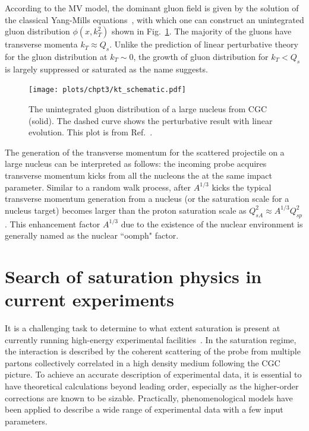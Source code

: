 According to the MV model, the dominant gluon field is given by the solution of
the classical Yang-Mills equations~\cite{Kovchegov:1996ty}, with
which one can construct an unintegrated gluon distribution $\phi(x,k^{2}_{T})$
shown in Fig.~\ref{fig:gluon_TMD}. The majority of the gluons have transverse
momenta $k_{T}\approx Q_{s}$. Unlike the prediction of linear perturbative
theory for the gluon distribution at $k_{T}\sim0$, the growth of gluon distribution
for $k_{T}<Q_{s}$ is largely suppressed or saturated as the name suggests.
\begin{figure}
\centering
\texttt{[image: plots/chpt3/kt\_schematic.pdf]}
\caption[Unintegrated gluon distribution]{
The unintegrated gluon distribution of a large nucleus from CGC (solid). The dashed curve 
shows the perturbative result with linear evolution. This plot is from Ref.~\cite{Accardi:2012qut}.}
\label{fig:gluon_TMD}
\end{figure}
The generation of the transverse momentum for the scattered projectile on a
large nucleus can be interpreted as follows: the incoming probe acquires
transverse momentum kicks from all the nucleons the at the same impact
parameter. Similar to a random walk process, after $A^{1/3}$ kicks the typical
transverse momentum generation from a nucleus (or the saturation scale for a
nucleus target) becomes larger than the proton saturation scale as
$Q_{sA}^{2}\approx A^{1/3}Q^{2}_{sp}$. This enhancement factor $A^{1/3}$ due to
the existence of the nuclear environment is generally named as the nuclear
``oomph" factor.


\section{Search of saturation physics in current experiments}\label{sec:sat_search}

It is a challenging task to determine to what extent saturation is present at
currently running high-energy experimental facilities~\cite{Albacete:2010rh}. In
the saturation regime, the interaction is described by the coherent scattering
of the probe from multiple partons collectively correlated in a high density
medium following the CGC picture. To achieve an accurate description of
experimental data, it is essential to have theoretical calculations beyond
leading order, especially as the higher-order corrections are known to be
sizable. Practically, phenomenological models have been applied to describe a
wide range of experimental data with a few input parameters.

